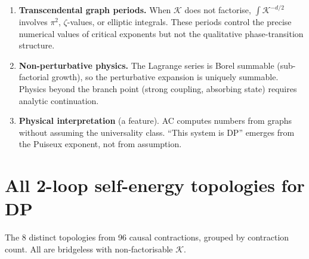 \documentclass[11pt,a4paper]{article}
\theoremstyle{definition}
\newcommand{\K}{\mathcal{K}}
\begin{document}
\begin{enumerate}[leftmargin=2em]
\item \textbf{Transcendental graph periods.}
When $\K$ does not factorise, $\int \K^{-d/2}$ involves $\pi^2$,
$\zeta$-values, or elliptic integrals. These periods control the
precise numerical values of critical exponents but not the
qualitative phase-transition structure.

\item \textbf{Non-perturbative physics.}
The Lagrange series is Borel summable (sub-factorial growth), so
the perturbative expansion is uniquely summable. Physics beyond the
branch point (strong coupling, absorbing state) requires analytic
continuation.

\item \textbf{Physical interpretation} (a feature).
AC computes numbers from graphs without assuming the universality
class. ``This system is DP'' emerges from the Puiseux exponent,
not from assumption.
\end{enumerate}


\appendix
\section{All 2-loop self-energy topologies for DP}
\label{app:dp_diagrams}

The 8 distinct topologies from 96 causal contractions, grouped by
contraction count. All are bridgeless with non-factorisable $\K$.
\end{document}
